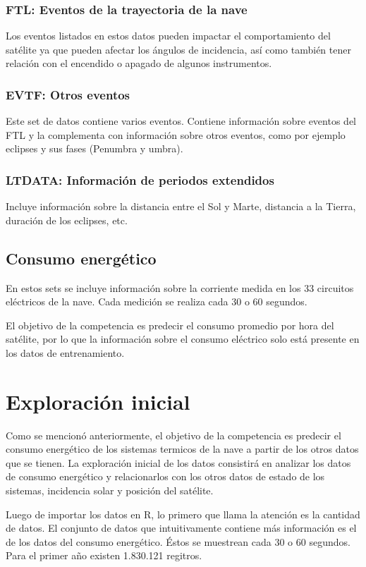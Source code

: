 \documentclass[../Main.tex]{subfiles}
\begin{document}
\subsubsection*{FTL: Eventos de la trayectoria de la nave}
Los eventos listados en estos datos pueden impactar el comportamiento del satélite ya que pueden afectar los ángulos de incidencia, así como también tener relación con el encendido o apagado de algunos instrumentos.
\subsubsection*{EVTF: Otros eventos}
Este set de datos contiene varios eventos. Contiene información sobre eventos del FTL y la complementa con información sobre otros eventos, como por ejemplo eclipses y sus fases (Penumbra y umbra).
\subsubsection*{LTDATA: Información de periodos extendidos}
Incluye información sobre la distancia entre el Sol y Marte, distancia a la Tierra, duración de los eclipses, etc.

\subsection*{Consumo energético}
En estos sets se incluye información sobre la corriente medida en los 33 circuitos eléctricos de la nave. Cada medición se realiza cada 30 o 60 segundos. 
\newline \par 
El objetivo de la competencia es predecir el consumo promedio por hora del satélite, por lo que la información sobre el consumo eléctrico solo está presente en los datos de entrenamiento.

\section{Exploración inicial}
Como se mencionó anteriormente, el objetivo de la competencia es predecir el consumo energético de los sistemas termicos de la nave a partir de los otros datos que se tienen. La exploración inicial de los datos consistirá en analizar los datos de consumo energético y relacionarlos con los otros datos de estado de los sistemas, incidencia solar y posición del satélite.
\newline \par 
Luego de importar los datos en R, lo primero que llama la atención es la cantidad de datos. El conjunto de datos que intuitivamente contiene más información es el de los datos del consumo energético. Éstos se muestrean cada 30 o 60 segundos. Para el primer año existen 1.830.121 regitros.
\end{document}
